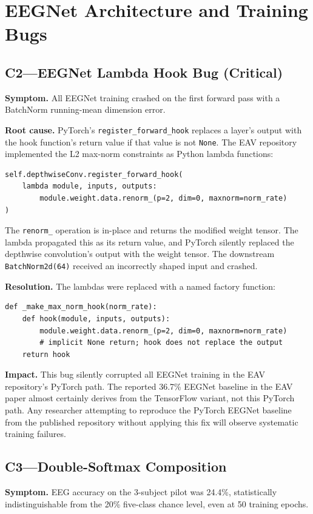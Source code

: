 \section{EEGNet Architecture and Training Bugs}
\subsection*{C2---EEGNet Lambda Hook Bug (Critical)}
\textbf{Symptom.} All EEGNet training crashed on the first forward pass with a BatchNorm running-mean dimension error.

\textbf{Root cause.} PyTorch's \texttt{register\_forward\_hook} replaces a layer's output with the hook function's return value if that value is not \texttt{None}. The EAV repository implemented the L2 max-norm constraints as Python lambda functions:

\begin{verbatim}
self.depthwiseConv.register_forward_hook(
    lambda module, inputs, outputs:
        module.weight.data.renorm_(p=2, dim=0, maxnorm=norm_rate)
)
\end{verbatim}

The \texttt{renorm\_} operation is in-place and returns the modified weight tensor. The lambda propagated this as its return value, and PyTorch silently replaced the depthwise convolution's output with the weight tensor. The downstream \texttt{BatchNorm2d(64)} received an incorrectly shaped input and crashed.

\textbf{Resolution.} The lambdas were replaced with a named factory function:

\begin{verbatim}
def _make_max_norm_hook(norm_rate):
    def hook(module, inputs, outputs):
        module.weight.data.renorm_(p=2, dim=0, maxnorm=norm_rate)
        # implicit None return; hook does not replace the output
    return hook
\end{verbatim}

\textbf{Impact.} This bug silently corrupted all EEGNet training in the EAV repository's PyTorch path. The reported 36.7\% EEGNet baseline in the EAV paper almost certainly derives from the TensorFlow variant, not this PyTorch path. Any researcher attempting to reproduce the PyTorch EEGNet baseline from the published repository without applying this fix will observe systematic training failures.

\subsection*{C3---Double-Softmax Composition}
\textbf{Symptom.} EEG accuracy on the 3-subject pilot was 24.4\%, statistically indistinguishable from the 20\% five-class chance level, even at 50 training epochs.

